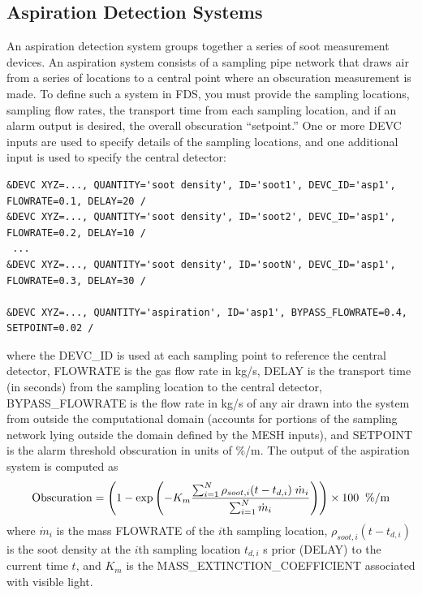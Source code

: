 \documentclass[11pt]{book}
\newcommand{\dm}{\dot{m}}
\newcommand{\be}{\begin{equation}}
\newcommand{\ee}{\end{equation}}
\begin{document}
\subsection{Aspiration Detection Systems}
\label{info:aspiration_detector}

An aspiration detection system groups together a series of soot measurement devices.
An aspiration system consists of a sampling pipe network that draws air from a series of locations to a central point
where an obscuration measurement is made.  To define such a system in FDS, you must provide the sampling locations,
sampling flow rates, the transport time from each sampling location, and if an alarm output is desired, the overall obscuration
``setpoint.''  One or more {\ct DEVC} inputs are used to specify details of the sampling locations, and one additional input is
used to specify the central detector:

\footnotesize
\begin{verbatim}
&DEVC XYZ=..., QUANTITY='soot density', ID='soot1', DEVC_ID='asp1', FLOWRATE=0.1, DELAY=20 /
&DEVC XYZ=..., QUANTITY='soot density', ID='soot2', DEVC_ID='asp1', FLOWRATE=0.2, DELAY=10 /
 ...
&DEVC XYZ=..., QUANTITY='soot density', ID='sootN', DEVC_ID='asp1', FLOWRATE=0.3, DELAY=30 /

&DEVC XYZ=..., QUANTITY='aspiration', ID='asp1', BYPASS_FLOWRATE=0.4, SETPOINT=0.02 /
\end{verbatim}
\normalsize

\noindent
where the {\ct DEVC\_ID} is used at each sampling point to reference the central detector, {\ct FLOWRATE} is the gas
flow rate in kg/s, {\ct DELAY} is the transport time (in seconds) from the sampling location to the central detector,
{\ct BYPASS\_FLOWRATE} is the flow rate in kg/s of any air drawn into the system from outside the computational
domain (accounts for portions of the sampling network lying outside the domain defined by the {\ct MESH}
inputs), and {\ct SETPOINT} is the alarm threshold obscuration in units of \%/m. The output of the aspiration system is
computed as
\be
  \hbox{Obscuration}  = \left(1 - \exp \left( -K_m \frac {\sum_{i=1}^N {\rho_{soot,i}( t-t_{d,i}) \; \dm_i}} {\sum_{i=1}^N{ \dm_i} } \right)  \right) \times 100  \; \; \hbox{\%/m}
\ee
where $\dm_i$ is the mass {\ct FLOWRATE} of the $i$th sampling location, $\rho_{soot,i}( t-t_{d,i})$ is the soot density at
the $i$th sampling location $t_{d,i}$ s prior ({\ct DELAY}) to the current time $t$, and $K_m$ is the {\ct MASS\_EXTINCTION\_COEFFICIENT} associated with visible light.
\end{document}
